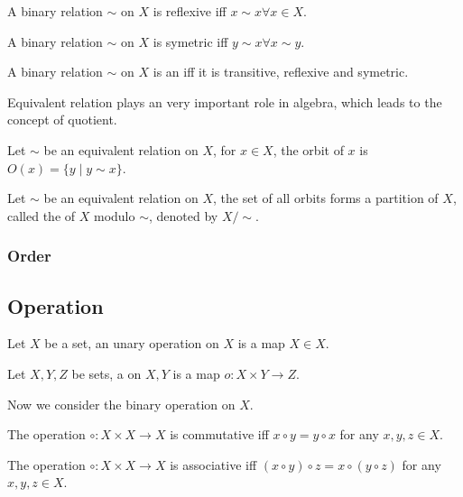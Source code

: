 \begin{defi}[reflexive]
A binary relation $\sim$ on $X$ is reflexive iff $x \sim x \forall x \in X$.
\end{defi}

\begin{defi}[symetric]
A binary relation $\sim$ on $X$ is symetric iff $y \sim x \forall x \sim y$.
\end{defi}

\begin{defi}
A binary relation $\sim$ on $X$ is an  iff it is transitive,
reflexive and symetric.
\end{defi}

Equivalent relation plays an very important role in algebra, which leads to the
concept of quotient.

\begin{defi}[orbit]
Let $\sim$ be an equivalent relation on $X$, for $x \in X$, the orbit of $x$ is
$O(x) = \{y \mid y \sim x\}$.
\end{defi}

\begin{defi}[quotient]
Let $\sim$ be an equivalent relation on $X$, the set of all orbits forms a partition
of $X$, called the  of $X$ modulo $\sim$, denoted by $X / \sim$.
\end{defi}

\subsubsection{Order}

\subsection{Operation}
\begin{defi}
Let $X$ be a set, an unary operation on $X$ is a map $X \in X$.
\end{defi}

\begin{defi}
Let $X, Y, Z$ be sets, a  on $X, Y$ is a map $o : X \times Y \to Z$.
\end{defi}

Now we consider the binary operation on $X$.

\begin{defi}
The operation $\circ : X \times X \to X$ is commutative iff $x \circ y = y \circ x$
for any $x, y, z \in X$.
\end{defi}

\begin{defi}
The operation $\circ : X \times X \to X$ is associative iff $(x \circ y) \circ z = x \circ (y \circ z)$
for any $x, y, z \in X$.
\end{defi}
